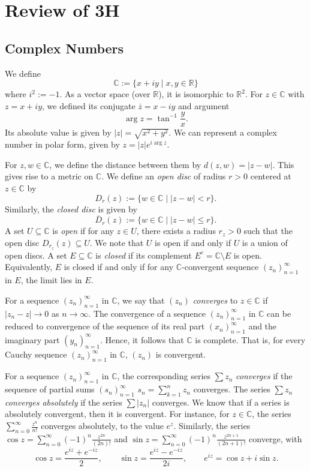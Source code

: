 \documentclass[a4paper, openany]{memoir}
\theoremstyle{definition}
\theoremstyle{plain}
\begin{document}
    \chapter{Review of 3H}
    \section{Complex Numbers}

    We define
    \[\mathbb{C} := \{x + iy \mid x, y \in \mathbb{R}\}\]
    where $i^2 := -1$. As a vector space (over $\mathbb{R}$), it is isomorphic to $\mathbb{R}^2$. For $z \in \mathbb{C}$ with $z = x + iy$, we defined its conjugate $\overline{z} = x - iy$ and argument 
    \[\arg z = \tan^{-1} \frac{y}{x}.\]
    Its absolute value is given by $|z| = \sqrt{x^2 + y^2}$. We can represent a complex number in polar form, given by $z = |z| e^{i \arg z}$.

    For $z, w \in \mathbb{C}$, we define the distance between them by $d(z, w) = |z - w|$. This gives rise to a metric on $\mathbb{C}$. We define an \emph{open disc} of radius $r > 0$ centered at $z \in \mathbb{C}$ by
    \[D_r(z) := \{w \in \mathbb{C} \mid |z - w| < r\}.\]
    Similarly, the \emph{closed disc} is given by
    \[\overline{D}_r(z) := \{w \in \mathbb{C} \mid |z -  w| \leq r\}.\]
    A set $U \subseteq \mathbb{C}$ is \emph{open} if for any $z \in U$, there exists a radius $r_z > 0$ such that the open disc $D_{r_z}(z) \subseteq U$. We note that $U$ is open if and only if $U$ is a union of open discs. A set $E \subseteq \mathbb{C}$ is \emph{closed} if its complement $E^c = \mathbb{C} \setminus E$ is open. Equivalently, $E$ is closed if and only if for any $\mathbb{C}$-convergent sequence $(z_n)_{n=1}^\infty$ in $E$, the limit lies in $E$.

    For a sequence $(z_n)_{n=1}^\infty$ in $\mathbb{C}$, we say that $(z_n)$ \emph{converges} to $z \in \mathbb{C}$ if $|z_n - z| \to 0$ as $n \to \infty$. The convergence of a sequence $(z_n)_{n=1}^\infty$ in $\mathbb{C}$ can be reduced to convergence of the sequence of its real part $(x_n)_{n=1}^\infty$ and the imaginary part $(y_n)_{n=1}^\infty$. Hence, it follows that $\mathbb{C}$ is complete. That is, for every Cauchy sequence $(z_n)_{n=1}^\infty$ in $\mathbb{C}$, $(z_n)$ is convergent.

    For a sequence $(z_n)_{n=1}^\infty$ in $\mathbb{C}$, the corresponding series $\sum z_n$ \emph{converges} if the sequence of partial sums $(s_n)_{n=1}^\infty$ $s_n = \sum_{k=1}^n z_n$ converges. The series $\sum z_n$ \emph{converges absolutely} if the series $\sum |z_n|$ converges. We know that if a series is absolutely convergent, then it is convergent. For instance, for $z \in \mathbb{C}$, the series $\sum_{n=0}^\infty \frac{z^n}{n!}$ converges absolutely, to the value $e^z$. Similarly, the series $\cos z = \sum_{n=0}^\infty (-1)^n \frac{z^{2n}}{(2n)!}$ and $\sin z = \sum_{n=0}^\infty (-1)^n \frac{z^{2n+1}}{(2n+1)!}$ converge, with
    \[\cos z = \frac{e^{iz} + e^{-iz}}{2}, \qquad \sin z = \frac{e^{iz} - e^{-iz}}{2i}, \qquad e^{iz} = \cos z + i \sin z.\]
\end{document}
